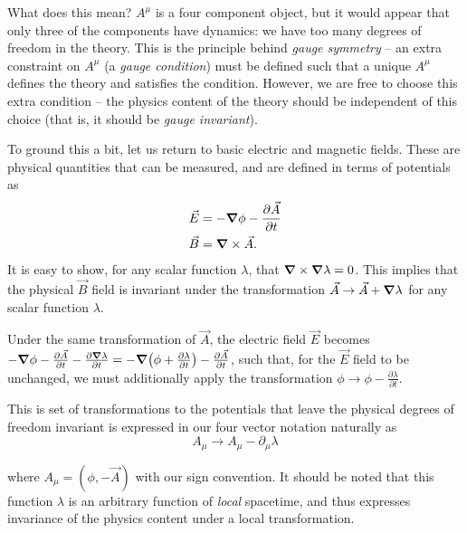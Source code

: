 What does this mean? $A^{\mu}$ is a four component object, but it would appear that only three 
of the components have dynamics: we have too many degrees of freedom in the theory. This is the 
principle behind \emph{gauge symmetry} -- an extra constraint on $A^{\mu}$ (a \emph{gauge condition}) 
must be defined such that a unique $A^{\mu}$ defines the theory and satisfies the condition. However, 
we are free to choose this extra condition -- the physics content of the theory should be independent 
of this choice (that is, it should be \emph{gauge invariant}).

To ground this a bit, let us return to basic electric and magnetic fields. These are physical 
quantities that can be measured, and are defined in terms of potentials as 
\begin{align}
\vec{E} &= -\grad\phi - \frac{\partial \vec{A}}{\partial t}\\
\vec{B} &= \grad \times \vec{A}.
\end{align}
It is easy to show, for any scalar function $\lambda$, that $\grad \times \grad\lambda = 0$. This implies 
that the physical $\vec{B}$ field is invariant under the transformation $\vec{A} \rightarrow \vec{A} + \grad\lambda$
for any scalar function $\lambda$.

Under the same transformation of $\vec{A}$, the electric field $\vec{E}$ becomes $-\grad\phi - \frac{\partial \vec{A}}{\partial t} - \frac{\partial \grad\lambda}{\partial t} = -\grad(\phi + \frac{\partial\lambda}{\partial t}) - \frac{\partial\vec{A}}{\partial t}$, such that, for the $\vec{E}$ field to be unchanged, we must additionally apply the transformation 
$\phi \rightarrow \phi - \frac{\partial\lambda}{\partial t}$.

This is set of transformations to the potentials that leave the physical degrees of freedom invariant is expressed 
in our four vector notation naturally as
\begin{equation}
A_{\mu} \rightarrow A_{\mu} - \partial_{\mu}\lambda
\end{equation}

where $A_{\mu} = (\phi, -\vec{A})$ with our sign convention. It should be noted that this 
function $\lambda$ is an arbitrary function of \emph{local} spacetime, and thus expresses 
invariance of the physics content under a local transformation.

